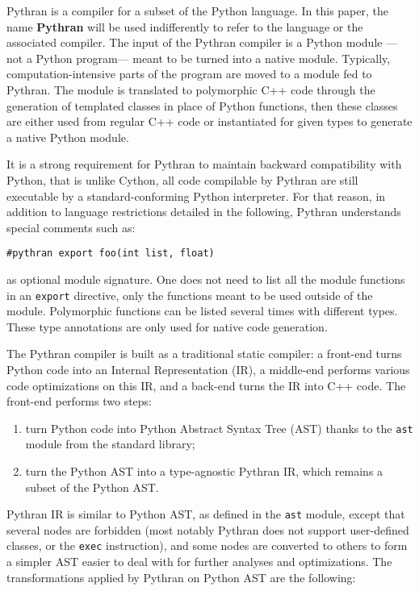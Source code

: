 \documentclass[10pt, onecolumn, preprint]{sigplanconf}
\begin{document}
Pythran is a compiler for a subset of the Python language. In this paper, the
name \textbf{Pythran} will be used indifferently to refer to the language or
the associated compiler. The input of the Pythran compiler is a Python module
---not a Python program--- meant to be turned into a native module. Typically,
computation-intensive parts of the program are moved to a module fed to
Pythran. The module is translated to polymorphic C++ code through the
generation of templated classes in place of Python functions, then these
classes are either used from regular C++ code or instantiated for given types
to generate a native Python module.

It is a strong requirement for Pythran to maintain backward compatibility with
Python, that is unlike Cython, all code compilable by Pythran are still
executable by a standard-conforming Python interpreter. For that reason, in
addition to language restrictions detailed in the following, Pythran
understands special comments such as:

\begin{lstlisting}
#pythran export foo(int list, float)
\end{lstlisting}

as optional module signature. One does not need to list all the module
functions in an \texttt{export} directive, only the functions meant to be used
outside of the module. Polymorphic functions can be listed several times with
different types. These type annotations are only used for native code generation.

The Pythran compiler is built as a traditional static compiler: a front-end
turns Python code into an Internal Representation (IR), a middle-end performs
various code optimizations on this IR, and a back-end turns the IR into C++
code. The front-end performs two steps:

\begin{enumerate}

    \item turn Python code into Python Abstract Syntax Tree (AST) thanks to the \texttt{ast}
   module from the standard library;

    \item turn the Python AST into a type-agnostic Pythran IR, which remains a subset
   of the Python AST.

\end{enumerate}

Pythran IR is similar to Python AST, as defined in the \texttt{ast} module, except
that several nodes are forbidden (most notably Pythran does not support
user-defined classes, or the \texttt{exec} instruction), and some nodes are converted
to others to form a simpler AST easier to deal with for further analyses and
optimizations. The transformations applied by Pythran on Python AST are the
following:
\end{document}
